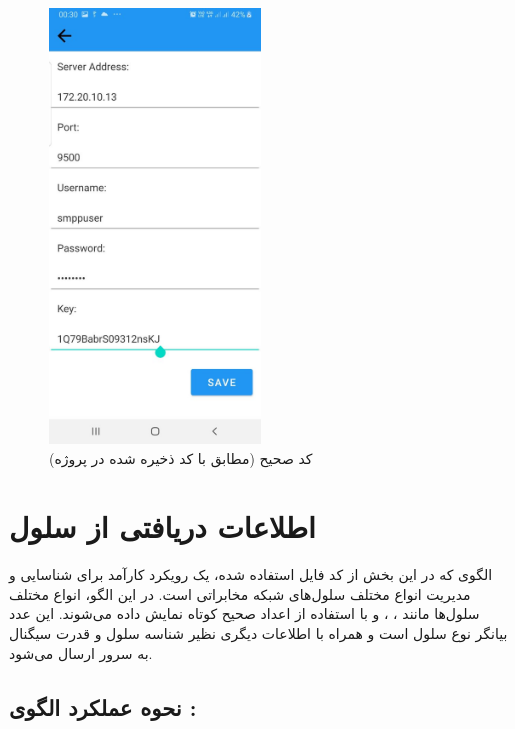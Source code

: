 \documentclass{report}
\begin{document}
\begin{figure}[b]
	\centering
	\includegraphics[width=0.5\textwidth]{Pic/CorrectCode}
	\caption{کد صحیح (مطابق با کد ذخیره شده در پروژه)}
	\label{fig:CorrectCode}
\end{figure}


\section{اطلاعات دریافتی از سلول}
\begin{latin}
	
	\label{code:enums}
\end{latin}
الگوی
 که در این بخش از کد فایل 
استفاده شده، یک رویکرد کارآمد برای شناسایی و مدیریت انواع مختلف سلول‌های شبکه مخابراتی است. در این الگو، انواع مختلف سلول‌ها مانند
 ،
  ،
    و
      با استفاده از اعداد صحیح کوتاه نمایش داده می‌شوند. این عدد بیانگر نوع سلول است و همراه با اطلاعات دیگری نظیر شناسه سلول و قدرت سیگنال به سرور ارسال می‌شود.

\subsection{نحوه عملکرد الگوی
 :}
 
\end{document}
